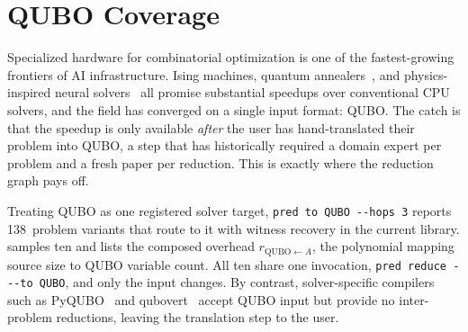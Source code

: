 \documentclass{article}
\begin{document}
\section{QUBO Coverage}\label{app:qubo-coverage}

Specialized hardware for combinatorial optimization is one of the fastest-growing frontiers of AI infrastructure.
Ising machines, quantum annealers~\cite{glover2019}, and physics-inspired neural solvers~\cite{Schuetz2022PhysicsGNN} all promise substantial speedups over conventional CPU solvers, and the field has converged on a single input format: QUBO.
The catch is that the speedup is only available \emph{after} the user has hand-translated their problem into QUBO, a step that has historically required a domain expert per problem and a fresh paper per reduction.
This is exactly where the reduction graph pays off.

Treating QUBO as one registered solver target, \texttt{pred to QUBO -{}-hops 3} reports 138~problem variants that route to it with witness recovery in the current library.
 samples ten and lists the composed overhead $r_{\text{QUBO} \leftarrow A}$, the polynomial mapping source size to QUBO variable count.
All ten share one invocation, \texttt{pred reduce - -{}-to QUBO}, and only the input changes.
By contrast, solver-specific compilers such as PyQUBO~\cite{Zaman2021PyQUBO} and qubovert~\cite{Iosue2022qubovert} accept QUBO input but provide no inter-problem reductions, leaving the translation step to the user.
\end{document}
